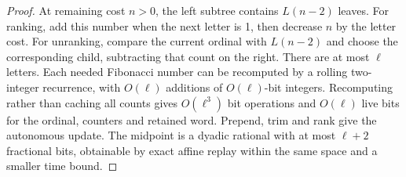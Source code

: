 \begin{proof}
At remaining cost $n>0$, the left subtree contains $L(n-2)$ leaves.
For ranking, add this number when the next letter is 1, then decrease
$n$ by the letter cost. For unranking, compare the current ordinal with
$L(n-2)$ and choose the corresponding child, subtracting that count on
the right. There are at most $\ell$ letters. Each needed Fibonacci
number can be recomputed by a rolling two-integer recurrence, with
$O(\ell)$ additions of $O(\ell)$-bit integers. Recomputing rather than
caching all counts gives $O(\ell^3)$ bit operations and $O(\ell)$ live
bits for the ordinal, counters and retained word. Prepend, trim and rank
give the autonomous update. The midpoint is a dyadic rational with at
most $\ell+2$ fractional bits, obtainable by exact affine replay within
the same space and a smaller time bound.
\end{proof}
